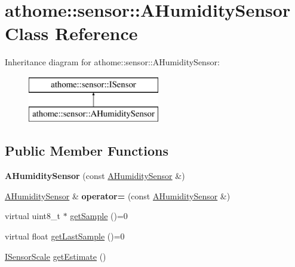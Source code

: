 \hypertarget{classathome_1_1sensor_1_1_a_humidity_sensor}{}\section{athome\+:\+:sensor\+:\+:A\+Humidity\+Sensor Class Reference}
\label{classathome_1_1sensor_1_1_a_humidity_sensor}
Inheritance diagram for athome\+:\+:sensor\+:\+:A\+Humidity\+Sensor\+:\begin{figure}[H]
\begin{center}
\leavevmode
\includegraphics[height=2.000000cm]{classathome_1_1sensor_1_1_a_humidity_sensor}
\end{center}
\end{figure}
\subsection*{Public Member Functions}
\begin{DoxyCompactItemize}
\item 
\mbox{\label{classathome_1_1sensor_1_1_a_humidity_sensor_ad6ed330676815e85edb90ff3757a699b}} 
{\bfseries A\+Humidity\+Sensor} (const \mbox{\hyperlink{classathome_1_1sensor_1_1_a_humidity_sensor}{A\+Humidity\+Sensor}} \&)
\item 
\mbox{\label{classathome_1_1sensor_1_1_a_humidity_sensor_a5f3cd554591f571e3bab38bc92462f84}} 
\mbox{\hyperlink{classathome_1_1sensor_1_1_a_humidity_sensor}{A\+Humidity\+Sensor}} \& {\bfseries operator=} (const \mbox{\hyperlink{classathome_1_1sensor_1_1_a_humidity_sensor}{A\+Humidity\+Sensor}} \&)
\item 
virtual uint8\+\_\+t $\ast$ \mbox{\hyperlink{classathome_1_1sensor_1_1_a_humidity_sensor_a2eb6de3ce2a4aeae0d9e556389d2b329}{get\+Sample}} ()=0
\item 
virtual float \mbox{\hyperlink{classathome_1_1sensor_1_1_a_humidity_sensor_ae251ee6e1fe5f9c2601f9a4464cfc5d1}{get\+Last\+Sample}} ()=0
\item 
\mbox{\hyperlink{classathome_1_1sensor_1_1_i_sensor_aa70bc27a4c17c86caf96cca776541ddf}{I\+Sensor\+Scale}} \mbox{\hyperlink{classathome_1_1sensor_1_1_a_humidity_sensor_a1da82433989c79066ce32d5606f4f675}{get\+Estimate}} ()
\end{DoxyCompactItemize}
